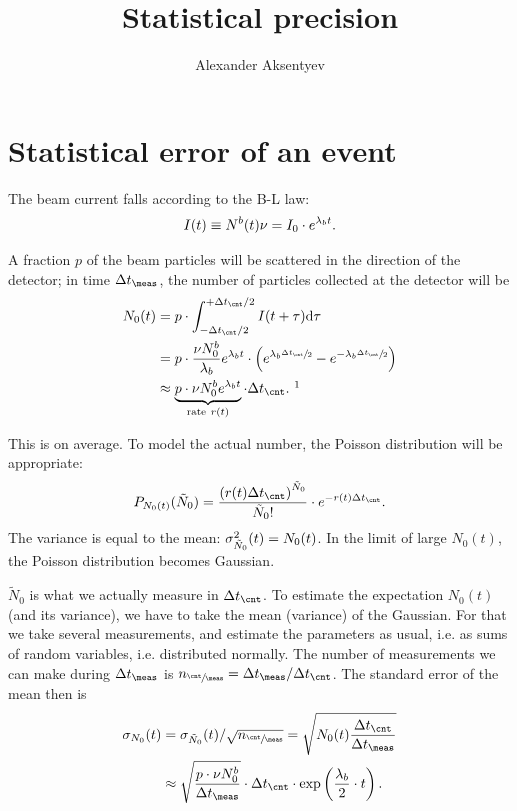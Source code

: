 \documentclass{article}
\begin{document}
	
\title{Statistical precision}
\author{Alexander Aksentyev}
\date{}
\maketitle
	
		
\section*{Statistical error of an event}

The beam current falls according to the B-L law:
\[
	I(t) \equiv N^b(t)\nu = I_0\cdot e^{\lambda_b t}.
\]

A fraction $p$ of the beam particles will be scattered in the direction of the detector; in time $\dtm$, the number of particles collected at the detector will be
\begin{align}
	N_0(t) & = p\cdot\int_{-\dtc/2}^{+\dtc/2} I(t+\tau)\td\tau \notag                    \\
	       & = p\cdot\frac{\nu N_0^b}{\lamb} e^{\lamb t}\cdot \bkt{e^{\lamb\sfrac{\dtc}{2}} - e^{-\lamb\sfrac{\dtc}{2}}} \notag \\
	       & \approx \underbrace{p\cdot\nu N_0^b e^{\lamb t}}_{\text{rate}~r(t)} \cdot\dtc.~\footnotemark
\end{align}

This is on average. To model the actual number, the Poisson distribution will be appropriate:
\[
	P_{N_0(t)}(\tilde{N}_0) = \frac{\bkt{r(t)\dtc}^{\tilde{N}_0}}{\tilde{N}_0!}\cdot e^{-r(t)\dtc}.
\]
The variance is equal to the mean: $\SD{\tilde{N}_0}^2(t) = N_0(t)$. In the limit of large $N_0(t)$, the Poisson distribution becomes Gaussian.

$\tilde{N}_0$ is what we actually measure in $\dtc$. To estimate the expectation $N_0(t)$ (and its variance), we have to take the mean (variance) of the Gaussian. For that we take several measurements, and estimate the parameters as usual, i.e. as sums of random variables, i.e. distributed normally. The number of measurements we can make during $\dtm$ is $\Ncm = \dtm/\dtc$. The standard error of the mean then is 
\begin{align}\label{eq:MeasSE}
	\SD{N_0}(t) & = \SD{\tilde{N}_0}(t)/\sqrt{\Ncm} = \sqrt{N_0(t)\frac{\dtc}{\dtm}}            \notag \\
	            & \approx \sqrt{\frac{p\cdot\nu N_0^b}{\dtm}}\cdot\dtc \cdot\exp\bkt{\frac{\lamb}{2}\cdot t}.
\end{align}
\newcommand{\A}{\frac{1}{\sqrt{p\cdot\nu N_0^b}}}
\end{document}
